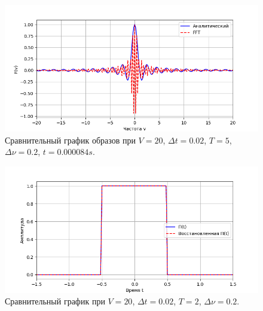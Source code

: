 \documentclass[a4paper]{article}
\begin{document}
\begin{figure}[H]
  \centering
  \includegraphics[width=\textwidth]{src/task_1_2/freq_5_0.02_20_0.2.png}
  \caption{Сравнительный график образов при $V=20$, $\Delta t=0.02$, $T=5$, $\Delta \nu=0.2$, $t=0.000084 s$.} 
\end{figure}
\begin{figure}[H]
  \centering
  \includegraphics[width=\textwidth]{src/task_1_2/time_5_0.02_20_0.2.png}
  \caption{Сравнительный график при $V=20$, $\Delta t=0.02$, $T=2$, $\Delta \nu=0.2$.} 
\end{figure}
\end{document}
